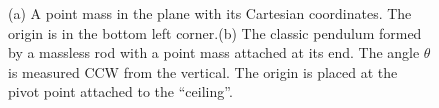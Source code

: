 


\bigskip

\begin{figure}[htb]%
\centering
{}%
\hspace{.3cm}
%
\hfill
\caption[]{(a) A point mass in the plane with its Cartesian coordinates. The origin is in the bottom left corner.(b) The classic pendulum formed by a massless rod with a point mass attached at its end. The angle $\theta$ is measured CCW from the vertical. The origin is placed at the pivot point attached to the ``ceiling''.}
    \label{fig:SimplestDynamics}
\end{figure}



